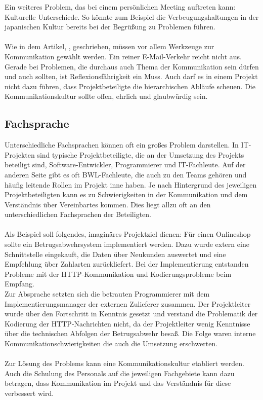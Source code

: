 \documentclass[12pt]{scrartcl}
\begin{document}
Ein weiteres Problem, das bei einem persönlichen Meeting auftreten kann: Kulturelle Unterschiede. So könnte zum Beispiel die Verbeugungshaltungen in der japanischen Kultur bereits bei der Begrüßung zu Problemen führen. \\
\\
Wie in dem Artikel, \cite{nur_emails_sind_zu_wenig}, geschrieben, müssen vor allem Werkzeuge zur Kommunikation gewählt werden. Ein reiner E-Mail-Verkehr reicht nicht aus. Gerade bei Problemen, die durchaus auch Thema der Kommunikation sein dürfen und auch sollten, ist Reflexionsfährigkeit ein Muss. Auch darf es in einem Projekt nicht dazu führen, dass Projektbeteiligte die hierarchischen Abläufe scheuen. Die Kommunikationskultur sollte offen, ehrlich und glaubwürdig sein.

\subsection{Fachsprache}
Unterschiedliche Fachsprachen können oft ein großes Problem darstellen. In IT-Projekten sind typische Projektbeteiligte, die an der Umsetzung des Projekts beteiligt sind, Software-Entwickler, Programmierer und IT-Fachleute. Auf der anderen Seite gibt es oft BWL-Fachleute, die auch zu den Teams gehören und häufig leitende Rollen im Projekt inne haben. Je nach Hintergrund des jeweiligen Projektbeteiligten kann es zu Schwierigkeiten in der Kommunikation und dem Verständnis über Vereinbartes kommen. Dies liegt allzu oft an den unterschiedlichen Fachsprachen der Beteiligten. \\
\\
Als Beispiel soll folgendes, imaginäres Projektziel dienen:
Für einen Onlineshop sollte ein Betrugsabwehrsystem implementiert werden. Dazu wurde extern eine Schnittstelle eingekauft, die Daten über Neukunden auswertet und eine Empfehlung über Zahlarten zurückliefert. Bei der Implementierung entstanden Probleme mit der HTTP-Kommunikation und Kodierungsprobleme beim Empfang.\\
Zur Absprache setzten sich die betrauten Programmierer mit dem Implementierungsmanager der externen Zulieferer zusammen. Der Projektleiter wurde über den Fortschritt in Kenntnis gesetzt und verstand die Problematik der Kodierung der HTTP-Nachrichten nicht, da der Projektleiter wenig Kenntnisse über die technischen Abfolgen der Betrugsabwehr besaß. Die Folge waren interne Kommunikationschwierigkeiten die auch die Umsetzung erschwerten.\\ 
\\
Zur Lösung des Problems kann eine Kommunikationskultur etabliert werden. Auch die Schulung des Personals auf die jeweiligen Fachgebiete kann dazu betragen, dass Kommunikation im Projekt und das Verständnis für diese verbessert wird. 
\end{document}
